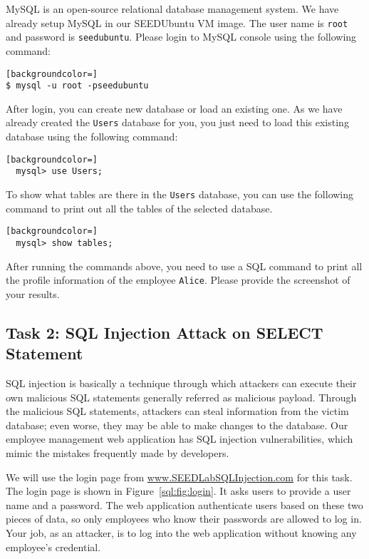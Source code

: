 MySQL is an open-source relational database management system. 
We have already setup MySQL in our SEEDUbuntu VM image. 
The user name is {\tt root} and password is {\tt seedubuntu}.  
Please login to MySQL console using the following command:
	
\begin{lstlisting}[backgroundcolor=]
$ mysql -u root -pseedubuntu 
\end{lstlisting}


After login, you can create new database or load an existing
one. As we have already created the {\tt Users} database for you, you just
need to load this existing database using the following command: 

\begin{lstlisting}[backgroundcolor=]
  mysql> use Users;
\end{lstlisting}


To show what tables are there in the {\tt Users} database, 
you can use the following command to print out all the tables of the
selected database.

\begin{lstlisting}[backgroundcolor=]
  mysql> show tables;
\end{lstlisting}


After running the commands above, you need to use 
a SQL command to print all the profile information of
the employee {\tt Alice}. Please provide the screenshot of your results.





\subsection{Task 2: SQL Injection Attack on SELECT Statement} 


SQL injection is basically a technique through
which attackers can execute their own malicious SQL statements generally
referred as malicious payload. Through the malicious SQL statements, 
attackers can steal information from the victim database; even worse,
they may be able to make changes to the database. Our employee
management web application has SQL injection vulnerabilities, which mimic 
the mistakes frequently made by developers. 

We will use the login page from \url{www.SEEDLabSQLInjection.com}
for this task. The login page is shown in Figure~\ref{sql:fig:login}. 
It asks users to provide a user name and a password.
The web application authenticate users based on these two pieces 
of data, so only employees who know their 
passwords are allowed to log in.
Your job, as an attacker, is to log into the web application without knowing
any employee's credential. 


